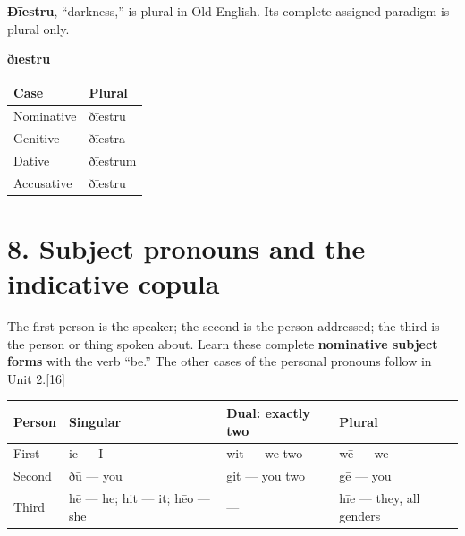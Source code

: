 \textbf{Ðīestru}, “darkness,” is plural in Old English. Its complete assigned paradigm is plural only.

\textbf{ðīestru}\par\nobreak

\par\begingroup
\fontsize{10.5}{13.2}\selectfont
\setlength{\LTleft}{0pt}\setlength{\LTright}{\fill}
\noindent
\begin{tabular}{@{}>{\raggedright\arraybackslash}p{60.594mm}>{\raggedright\arraybackslash}p{60.594mm}@{}}
\toprule
\textbf{Case} & \textbf{Plural} \\
\midrule
Nominative & ðīestru \\
Genitive & ðīestra \\
Dative & ðīestrum \\
Accusative & ðīestru \\
\bottomrule
\end{tabular}
\par\endgroup

\section*{8. Subject pronouns and the indicative copula}

The first person is the speaker; the second is the person addressed; the third is the person or thing spoken about. Learn these complete \textbf{nominative subject forms} with the verb “be.” The other cases of the personal pronouns follow in Unit 2.[16]

\par\begingroup
\fontsize{10.5}{13.2}\selectfont
\setlength{\LTleft}{0pt}\setlength{\LTright}{\fill}
\noindent
\begin{tabular}{@{}>{\raggedright\arraybackslash}p{21.929mm}>{\raggedright\arraybackslash}p{37.279mm}>{\raggedright\arraybackslash}p{25.218mm}>{\raggedright\arraybackslash}p{31.139mm}@{}}
\toprule
\textbf{Person} & \textbf{Singular} & \textbf{Dual: exactly two} & \textbf{Plural} \\
\midrule
First & ic — I & wit — we two & wē — we \\
Second & ðū — you & git — you two & gē — you \\
Third & hē — he; hit — it; hēo — she & — & hīe — they, all genders \\
\bottomrule
\end{tabular}
\par\endgroup

